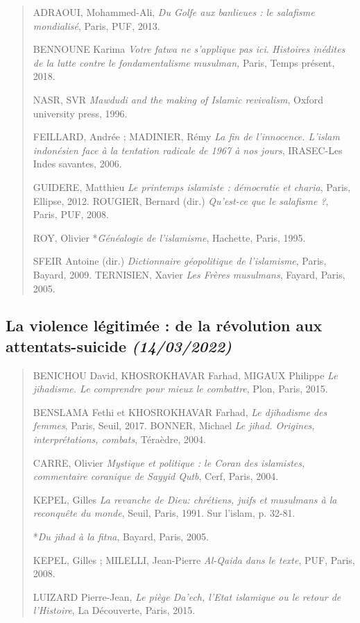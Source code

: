 \begin{quote}
ADRAOUI, Mohammed-Ali, \emph{Du Golfe aux banlieues : le salafisme
mondialisé}, Paris, PUF, 2013.

BENNOUNE Karima \emph{Votre fatwa ne s'applique pas ici}.
\emph{Histoires inédites de la lutte contre le fondamentalisme
musulman,} Paris, Temps présent, 2018.

NASR, SVR \emph{Mawdudi and the making of Islamic revivalism}, Oxford
university press, 1996.

FEILLARD, Andrée ; MADINIER, Rémy \emph{La fin de l'innocence. L'islam
indonésien face à la tentation radicale de 1967 à nos jours}, IRASEC-Les
Indes savantes, 2006.

GUIDERE, Matthieu \emph{Le printemps islamiste : démocratie et charia},
Paris, Ellipse, 2012. ROUGIER, Bernard (dir.) \emph{Qu'est-ce que le
salafisme ?}, Paris, PUF, 2008.

ROY, Olivier *\emph{Généalogie de l'islamisme}, Hachette, Paris, 1995.

SFEIR Antoine (dir.) \emph{Dictionnaire géopolitique de l'islamisme},
Paris, Bayard, 2009. TERNISIEN, Xavier \emph{Les Frères musulmans},
Fayard, Paris, 2005.
\end{quote}

\hypertarget{la-violence-luxe9gitimuxe9e-de-la-ruxe9volution-aux-attentats-suicide-14032022}{%
\subsection{\texorpdfstring{{La violence légitimée : de la
révolution aux attentats-suicide}
\emph{(14/03/2022)}}{La violence légitimée : de la révolution aux attentats-suicide (14/03/2022)}}\label{la-violence-luxe9gitimuxe9e-de-la-ruxe9volution-aux-attentats-suicide-14032022}}

\begin{quote}
BENICHOU David, KHOSROKHAVAR Farhad, MIGAUX Philippe \emph{Le jihadisme.
Le comprendre pour mieux le combattre}, Plon, Paris, 2015.

BENSLAMA Fethi et KHOSROKHAVAR Farhad, \emph{Le djihadisme des femmes},
Paris, Seuil, 2017. BONNER, Michael \emph{Le jihad. Origines,
interprétations, combats}, Téraèdre, 2004.

CARRE, Olivier \emph{Mystique et politique : le Coran des islamistes,
commentaire coranique de Sayyid Qutb}, Cerf, Paris, 2004.

KEPEL, Gilles \emph{La revanche de Dieu: chrétiens, juifs et musulmans à
la reconquête du monde}, Seuil, Paris, 1991. Sur l'islam, p. 32-81.

*\emph{Du jihad à la fitna}, Bayard, Paris, 2005.

KEPEL, Gilles ; MILELLI, Jean-Pierre \emph{Al-Qaida dans le texte}, PUF,
Paris, 2008.

LUIZARD Pierre-Jean, \emph{Le piège Da'ech, l'Etat islamique ou le
retour de l'Histoire}, La Découverte, Paris, 2015.
\end{quote}

